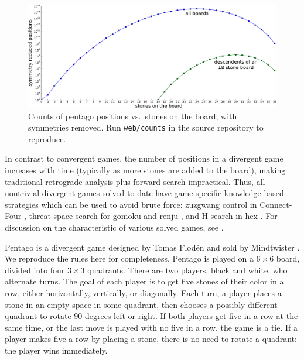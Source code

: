 \documentclass[conference]{IEEEtran}
\begin{document}
\begin{figure}
\begin{center}
\includegraphics[width=\columnwidth]{counts.pdf}
\end{center}
\vspace{-.1in}
\cprotect\caption{Counts of pentago positions vs.\ stones on the board, with symmetries removed.
Run \verb+web/counts+ in the source repository to reproduce.}
\label{counts}
\end{figure}

In contrast to convergent games, the number of positions in a divergent game increases with time
(typically as more stones are added to the board), making traditional retrograde analysis plus forward
search impractical.  Thus, all nontrivial
divergent games solved to date have game-specific knowledge based strategies which can be used to avoid brute
force: zuzgwang control in Connect-Four \cite{allis1988connectfour}, threat-space search for gomoku and renju
\cite{allis1993gomoku,wagner2001renju}, and H-search in hex \cite{arneson2011hex}.  For discussion
on the characteristic of various solved games, see \cite{van2002games}.

Pentago is a divergent game designed by Tomas Flod\'en and sold by Mindtwister \cite{mindtwister2013pentago}.
We reproduce the rules here for completeness.  Pentago is played on a $6 \times 6$ board, divided into four
$3 \times 3$ quadrants. There are two players, black and white, who alternate turns. The goal of each
player is to get five stones of their color in a row, either horizontally, vertically, or diagonally.
Each turn, a player places a stone in an empty space in some quadrant, then chooses a possibly different
quadrant to rotate 90 degrees left or right. If both players get five in a row at the same time, or the
last move is played with no five in a row, the game is a tie. If a player makes five a row by placing a
stone, there is no need to rotate a quadrant: the player wins immediately.
\end{document}
